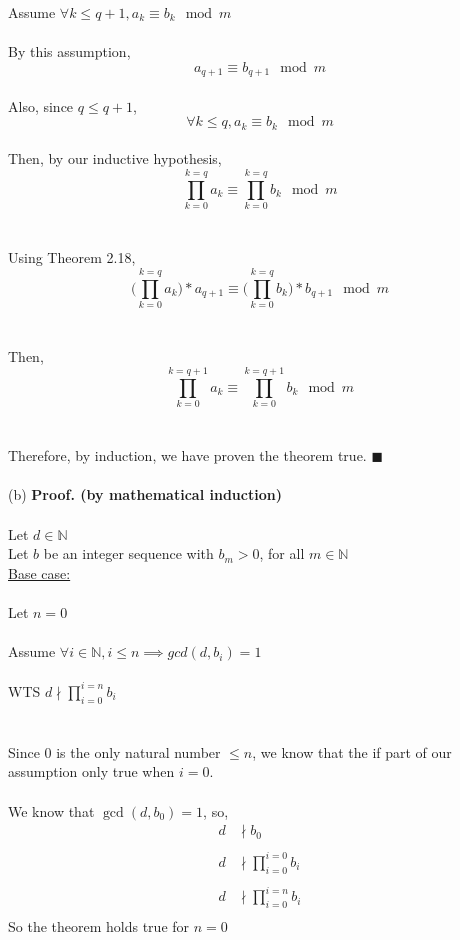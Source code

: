 \documentclass{article}
\newcommand{\N}{\mathbb{N}}
\begin{document}
\begin{enumerate}
	Assume $\forall k \leq q + 1, a_k \equiv b_k \mod m$\\\\
	By this assumption, $$a_{q+1} \equiv b_{q+1} \mod m$$\\
	Also, since $q \leq q + 1$, $$\forall k\leq q, a_k \equiv b_k \mod m$$\\
	Then, by our inductive hypothesis,\\ $$\displaystyle \prod_{k = 0}^{k=q} a_k\equiv {\displaystyle \prod_{k = 0}^{k=q} b_k} \mod m$$\\\\
	Using Theorem 2.18,\\ $$\displaystyle \Bigg( \prod_{k = 0}^{k=q} a_k\Bigg)* a_{q+1} \equiv 
	\displaystyle \Bigg( \prod_{k = 0}^{k=q} b_k\Bigg)* b_{q+1} \mod m$$\\\\
	Then, $$\displaystyle \prod_{k = 0}^{k=q+1} a_k \equiv \displaystyle \prod_{k = 0}^{k=q+1} b_k \mod m$$\\\\
	Therefore, by induction, we have proven the theorem true. \null\hfill $\blacksquare$\\\\
	
	(b) \textbf{Proof. (by mathematical induction)} \\\\
	Let $d \in \N$\\
	Let $b$ be an integer sequence with $b_m > 0$, for all $m \in \N$\\
	
	\underline{Base case:} \\\\
	Let $n=0$ \\\\
	Assume $\forall i \in \N, i \leq n \implies gcd(d, b_i) = 1$\\\\
	WTS $d \nmid \displaystyle \prod_{i=0}^{i=n} b_i$\\\\\\
	Since 0 is the only natural number $\leq n$, we know that the if part of our assumption only true 
	when $i = 0$.\\\\
	We know that $\gcd(d,b_0) = 1$, so,
	\begin{align*}
	d &\nmid b_0\\\\
	d &\nmid \displaystyle \prod_{i = 0}^{i=0} b_i\\\\
	d &\nmid \displaystyle \prod_{i =0}^{i=n} b_i\\
	\end{align*}
	So the theorem holds true for $n=0$\\\\
	

\end{enumerate}
\end{document}
